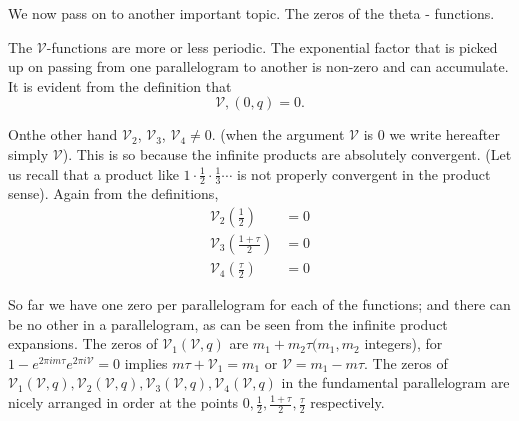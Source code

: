 We now pass on to another important topic. The zeros of the
theta - functions.

The $\mathscr{V}$-functions are more or less periodic. The exponential
factor that is picked up on passing from one parallelogram to another
is non-zero and can accumulate. It is evident from the definition that 
$$
\mathscr{V}, (0, q)=0.
$$

On\pageoriginale the other hand $\mathscr{V}_2$, $\mathscr{V}_3$, $\mathscr{V}_4\neq
0$. (when the argument $\mathscr{V}$ is 0 we write hereafter simply
$\mathscr{V}$). This is so because the infinite products are
absolutely convergent. (Let us recall that a product like $1 \cdot
\frac{1}{2} \cdot \frac{1}{3} \cdots$ is not properly convergent in
the product sense). Again from the definitions,
\begin{align*}
  \mathscr{V}_2 \left(\frac{1}{2}\right) & =0\\
  \mathscr{V}_3 \left(\frac{1+\tau}{2}\right) & =0\\  
  \mathscr{V}_4 \left(\frac{\tau}{2}\right) & =0
\end{align*}

So far we have one zero per parallelogram for each of the functions;
and there can be no other in a parallelogram, as can be seen from the
infinite product expansions. The zeros of $\mathscr{V}_1 (\mathscr{V},
q)$ are $m_1 + m_2 \tau (m_1, m_2$ integers), for $1- e^{2 \pi i m
  \tau}e^{2 \pi i \mathscr{V}}=0$ implies $m \tau + \mathscr{V}_1 =
m_1$ or $\mathscr{V}= m_1 - m \tau$. The zeros of $\mathscr{V}_1
(\mathscr{V}, q), \mathscr{V}_2(\mathscr{V}, q),
\mathscr{V}_3(\mathscr{V}, q), \mathscr{V}_4 (\mathscr{V}, q)$ in the
fundamental parallelogram are nicely arranged in order at the points
$0, \frac{1}{2}, \frac{1+\tau}{2}, \frac{\tau}{2}$ respectively.  

\begin{figure}[H]
\end{figure}


